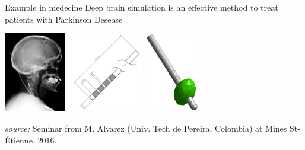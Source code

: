 \documentclass{beamer}
\begin{document}
\begin{frame}{}
\begin{exampleblock}{Example in medecine}
Deep brain simulation is an effective method to treat patients with Parkinson Desease
\begin{center}
\includegraphics[height=3.5cm]{figures/DeepBrainSimulation.png} \qquad \includegraphics[height=3.5cm]{figures/DBSelectrode.png} \qquad \includegraphics[height=3.5cm]{figures/DBSactivation}
\end{center}
\begin{flushright}
{\small \emph{source:} Seminar from M. Alvarez (Univ. Tech de Pereira, Colombia) at Mines St-\'Etienne, 2016.}
\end{flushright}
\end{exampleblock}
\end{frame}
\end{document}
